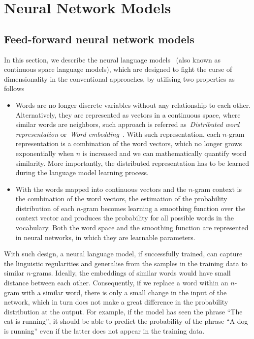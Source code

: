 \section{Neural Network Models}

\subsection{Feed-forward neural network models}
In this section, we describe the neural language models~\cite{bengio2006neural} (also known as continuous space language models), which are designed to fight the curse of dimensionality in the conventional approaches, by utilising two properties as follows

\begin{itemize}
	\item Words are no longer discrete variables without any relationship to each other. Alternatively, they are represented as vectors in a continuous space, where similar words are neighbors, such approach is referred as~\textit{Distributed word representation} or~\textit{Word embedding}~\cite{bengio2003neural}. With such representation, each $n$-gram representation is a combination of the word vectors, which no longer grows exponentially when $n$ is increased and we can mathematically quantify word similarity. More importantly, the distributed representation has to be learned during the language model learning process. 
	
	\item With the words mapped into continuous vectors and the $n$-gram context is the combination of the word vectors, the estimation of the probability distribution of each $n$-gram becomes learning a smoothing function over the context vector and produces the probability for all possible words in the vocabulary. Both the word space and the smoothing function are represented in neural networks, in which they are learnable parameters. 
\end{itemize}

With such design, a neural language model, if successfully trained, can capture the linguistic regularities and generalise from the samples in the training data to similar $n$-grams. Ideally, the embeddings of similar words would have small distance between each other. Consequently, if we replace a word within an $n$-gram with a similar word, there is only a small change in the input of the network, which in turn does not make a great difference in the probability distribution at the output. For example, if the model has seen the phrase ``The cat is running'', it should be able to predict the probability of the phrase ``A dog is running'' even if the latter does not appear in the training data.

